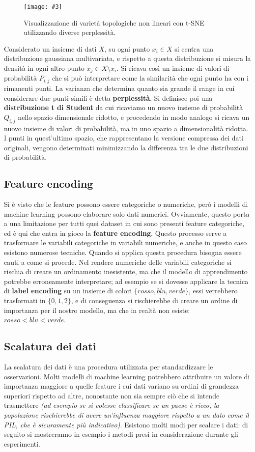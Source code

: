 \documentclass[12pt, twoside, letterpaper]{report}
\newcommand{\img}[4] {
	\begin{figure}
		\centering
		\texttt{[image: \#3]}\\
		\caption{#1}
		\label{fig:#4}
	\end{figure}
}
\begin{document}
					\img{Visualizzazione di varietà topologiche non lineari con t-SNE utilizzando diverse perplessità. \cite{sklearn}}{0.35}{tsne.png}{tsne}
				
					Considerato un insieme di dati $X$, su ogni punto $x_i \in X$ si centra una distribuzione gaussiana multivariata, e rispetto a questa distribuzione si misura la densità in ogni altro punto $x_j \in X \setminus x_i$. Si ricava così un insieme di valori di probabilità $P_{i,j}$ che si può interpretare come la similarità che ogni punto ha con i rimanenti punti. La varianza che determina quanto sia grande il range in cui considerare due punti simili è detta \textbf{perplessità}. Si definisce poi una \textbf{distribuzione t di Student} da cui ricaviamo un nuovo insieme di probabilità $Q_{i,j}$ nello spazio dimensionale ridotto, e procedendo in modo analogo si ricava un nuovo insieme di valori di probabilità, ma in uno spazio a dimensionalità ridotta. I punti in quest'ultimo spazio, che rappresentano la versione compressa dei dati originali, vengono determinati minimizzando la differenza tra le due distribuzioni di probabilità.
					
			\subsection{Feature encoding} 
				Si è visto che le feature possono essere categoriche o numeriche, però i modelli di machine learning possono elaborare solo dati numerici. Ovviamente, questo porta a una limitazione per tutti quei dataset in cui sono presenti feature categoriche, ed è qui che entra in gioco la \textbf{feature encoding}. Questo processo serve a trasformare le variabili categoriche in variabili numeriche, e anche in questo caso esistono numerose tecniche. Quando si applica questa procedura bisogna essere cauti a come si procede. Nel rendere numeriche delle variabili categoriche si rischia di creare un ordinamento inesistente, ma che il modello di apprendimento potrebbe erroneamente interpretare; ad esempio se si dovesse applicare la tecnica di \textbf{label encoding} su un insieme di colori $\{rosso, blu, verde\}$, essi verrebbero trasformati in $\{0,1,2\}$, e di conseguenza si rischierebbe di creare un ordine di importanza per il nostro modello, ma che in realtà non esiste: $rosso < blu < verde$.
				
			\subsection{Scalatura dei dati} La scalatura dei dati è una procedura utilizzata per standardizzare le osservazioni. Molti modelli di machine learning potrebbero attribuire un valore di importanza maggiore a quelle feature i cui dati variano su ordini di grandezza superiori rispetto ad altre, nonostante non sia sempre ciò che si intende trasmettere \textit{(ad esempio se si volesse classificare se un paese è ricco, la popolazione rischierebbe di avere un'influenza maggiore rispetto a un dato come il PIL, che è sicuramente più indicativo)}. Esistono molti modi per scalare i dati: di seguito si mostreranno in esempio i metodi presi in considerazione durante gli esperimenti.
			
\end{document}
